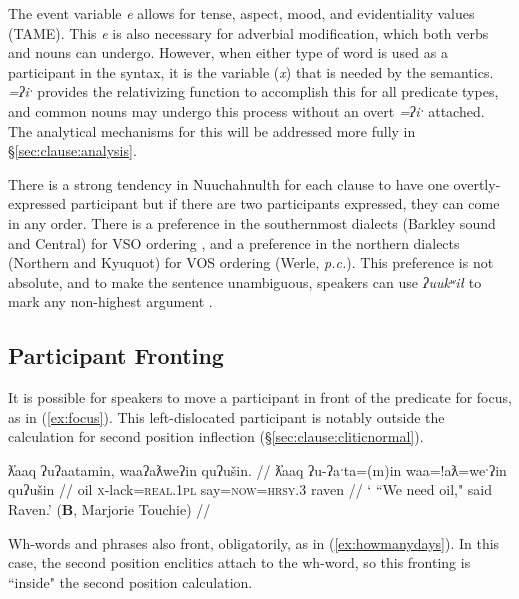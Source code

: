 The event variable \textit{e} allows for tense, aspect, mood, and evidentiality values (TAME). This \textit{e} is also necessary for adverbial modification, which both verbs and nouns can undergo. However, when either type of word is used as a participant in the syntax, it is the variable (\textit{x}) that is needed by the semantics. \textit{=ʔiˑ} provides the relativizing function to accomplish this for all predicate types, and common nouns may undergo this process without an overt \textit{=ʔiˑ} attached. The analytical mechanisms for this will be addressed more fully in \S\ref{sec:clause:analysis}.


There is a strong tendency in Nuuchahnulth for each clause to have one overtly-expressed participant \citep[38]{rose1981} but if there are two participants expressed, they can come in any order. There is a preference in the southernmost dialects (Barkley sound and Central) for VSO ordering \citep[267]{jacobsen1993}, and a preference in the northern dialects (Northern and Kyuquot) for VOS ordering (Werle, \textit{p.c.}). This preference is not absolute, and to make the sentence unambiguous, speakers can use \textit{ʔuukʷił} to mark any non-highest argument \citep{woo2007b}.

\subsection{Participant Fronting}

It is possible for speakers to move a participant in front of the predicate for focus, as in (\ref{ex:focus}). This left-dislocated participant is notably outside the calculation for second position inflection (\S\ref{sec:clause:cliticnormal}).

\ex \label{ex:focus}
\begingl
\glpreamble ƛ̓aaq ʔuʔaatamin, waaʔaƛweʔin quʔušin. //
\gla ƛ̓aaq ʔu-ʔaˑta=(m)in waa=!aƛ=weˑʔin quʔušin //
\glb oil \textsc{x}-lack=\textsc{real.1pl} say=\textsc{now}=\textsc{hrsy.3} raven //
\glft ` ``We need oil," said Raven.' (\textbf{B}, Marjorie Touchie) //
\endgl
\xe

Wh-words and phrases also front, obligatorily, as in (\ref{ex:howmanydays}). In this case, the second position enclitics attach to the wh-word, so this fronting is ``inside" the second position calculation.


